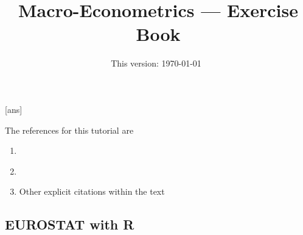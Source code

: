 \documentclass[11pt]{article}
\newcommand*{\varp}[1][p]{VAR(#1)}
\begin{document}
[ans]

\title{Macro-Econometrics --- Exercise Book}

\author{}

\date{This version: \today ~\currenttime}

\maketitle

The references for this tutorial are
\begin{enumerate}[label=\roman*.]
    \item \cite{MartinHurnHarris-2012}
    \item \cite{Mutschler-2018-github_repo}
    \item Other explicit citations within the text
\end{enumerate}

\subsection{EUROSTAT with R}


% 

% 

% 
\end{document}
